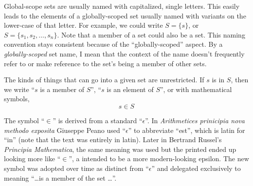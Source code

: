 \documentclass{article}
\begin{document}
	Global-scope sets are usually named with capitalized, single letters. This easily leads to the elements of a globally-scoped set usually named with variants on the lower-case of that letter. For example, we could write $S = \{ s \}$, or $S = \{ s_1, s_2, \dots, s_n \}$. Note that a member of a set could also be a set. This naming convention stays consistent because of the ``globally-scoped'' aspect. By a \textit{globally-scoped} set name, I mean that the context of the name doesn't frequently refer to or make reference to the set's being a member of other sets.

	The kinds of things that can go into a given set are unrestricted. If $s$ is in $S$, then we write ``$s$ is a member of $S$'', ``$s$ is an element of $S$'', or with mathematical symbols,  \[ s \in S \]

	The symbol ``$\in$'' is derived from a standard ``$\epsilon$''. In \textit{Arithmetices prinicipia nova methodo exposita} Giuseppe Peano used ``$\epsilon$'' to abbreviate ``est'', which is latin for ``in'' (note that the text was entirely in latin). Later in Bertrand Russel's \textit{Principia Mathematica}, the same meaning was used but the printed ended up looking more like ``$\in$'', a intended to be a more modern-looking epsilon. The new symbol was adopted over time as distinct from ``$\epsilon$'' and delegated exclusively to meaning ``\dots is a member of the set \dots''.
\end{document}
